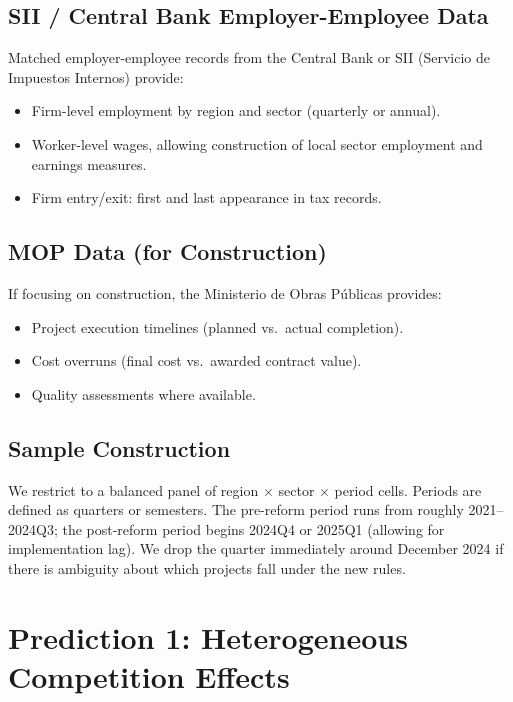\documentclass[12pt]{article}
\begin{document}
\subsection{SII / Central Bank Employer-Employee Data}

Matched employer-employee records from the Central Bank or SII (Servicio de Impuestos Internos) provide:

\begin{itemize}[itemsep=4pt]
    \item Firm-level employment by region and sector (quarterly or annual).
    \item Worker-level wages, allowing construction of local sector employment and earnings measures.
    \item Firm entry/exit: first and last appearance in tax records.
\end{itemize}

\subsection{MOP Data (for Construction)}

If focusing on construction, the Ministerio de Obras P\'{u}blicas provides:

\begin{itemize}[itemsep=4pt]
    \item Project execution timelines (planned vs.\ actual completion).
    \item Cost overruns (final cost vs.\ awarded contract value).
    \item Quality assessments where available.
\end{itemize}

\subsection{Sample Construction}

We restrict to a balanced panel of region $\times$ sector $\times$ period cells. Periods are defined as quarters or semesters. The pre-reform period runs from roughly 2021--2024Q3; the post-reform period begins 2024Q4 or 2025Q1 (allowing for implementation lag). We drop the quarter immediately around December 2024 if there is ambiguity about which projects fall under the new rules.

\section{Prediction 1: Heterogeneous Competition Effects}
\end{document}
